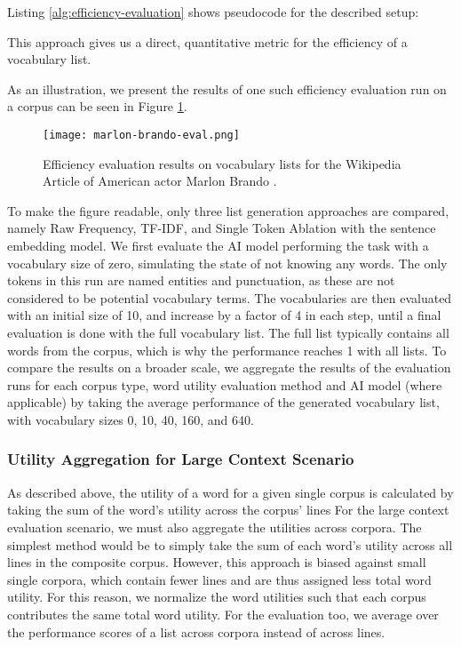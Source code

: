 Listing \ref{alg:efficiency-evaluation} shows pseudocode for the described setup:




This approach gives us a direct, quantitative metric for the efficiency of a vocabulary list.

As an illustration, we present the results of one such efficiency evaluation run on a corpus can be seen in Figure \ref{fig:marlon-brando-eval}.
\begin{figure}[H]
	\centering
	\texttt{[image: marlon-brando-eval.png]}
	\caption{Efficiency evaluation results on vocabulary lists for the Wikipedia Article of American actor Marlon Brando \protect\footnotemark.}
	\label{fig:marlon-brando-eval}
\end{figure}


To make the figure readable, only three list generation approaches are compared, namely Raw Frequency, TF-IDF, and Single Token Ablation with the sentence embedding model.
We first evaluate the AI model performing the task with a vocabulary size of zero, simulating the state of not knowing any words.
The only tokens in this run are named entities and punctuation, as these are not considered to be potential vocabulary terms.
The vocabularies are then evaluated with an initial size of 10, and increase by a factor of 4 in each step, until a final evaluation is done with the full vocabulary list.
The full list typically contains all words from the corpus, which is why the performance reaches 1 with all lists.
To compare the results on a broader scale, we aggregate the results of the evaluation runs for each corpus type, word utility evaluation method and AI model (where applicable) by taking the average performance of the generated vocabulary list, with vocabulary sizes 0, 10, 40, 160, and 640.

\subsubsection{Utility Aggregation for Large Context Scenario}
As described above, the utility of a word for a given single corpus is calculated by taking the sum of the word's utility across the corpus' lines
For the large context evaluation scenario, we must also aggregate the utilities across corpora.
The simplest method would be to simply take the sum of each word's utility across all lines in the composite corpus.
However, this approach is biased against small single corpora, which contain fewer lines and are thus assigned less total word utility.
For this reason, we normalize the word utilities such that each corpus contributes the same total word utility.
For the evaluation too, we average over the performance scores of a list across corpora instead of across lines.

